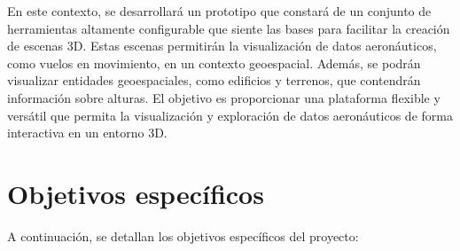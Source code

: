 \documentclass[a4paper, 11pt]{book}
\begin{document}
En este contexto, se desarrollará un prototipo que constará de un conjunto de herramientas altamente configurable que siente las bases para facilitar la creación de escenas \textsc{3D}. 
Estas escenas permitirán la visualización de datos aeronáuticos, como vuelos en movimiento, en un contexto geoespacial. Además, se podrán visualizar entidades geoespaciales, como edificios y terrenos, que contendrán información sobre alturas. El objetivo es proporcionar una plataforma flexible y versátil que permita la visualización y exploración de datos aeronáuticos de forma interactiva en un entorno 3D.
\section{Objetivos específicos} %
\label{sec:objetivosEspecificos} %
A continuación, se detallan los objetivos específicos del proyecto:
\end{document}
